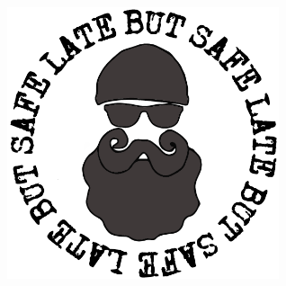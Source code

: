 %
%
%

\thispagestyle{empty}

\begin{titlepage}
	\begin{center}
		\dataUM\\	
		\vspace{2cm}
		\includegraphics[width=8cm, height=8cm]{../../logo}\\
		\vspace{2cm}
		\Huge{\bfseries{\titoloDoc}}\\
		\vfill
	

\end{center}
\end{titlepage}
